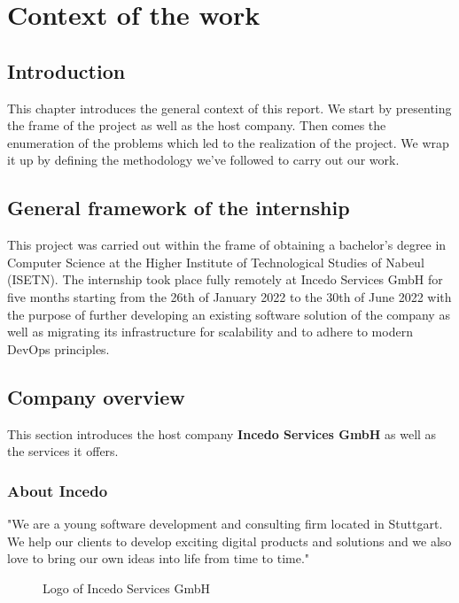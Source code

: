 \chapter{Context of the work}
\newpage

\setcounter{secnumdepth}{0} %
\section{Introduction}
This chapter introduces the general context of this report.
We start by presenting the frame of the project as well as the host company.
Then comes the enumeration of the problems which led to the realization of the project.
We wrap it up by defining the methodology we’ve followed to carry out our work.

\setcounter{secnumdepth}{2} %
\section{General framework of the internship}
This project was carried out within the frame of obtaining a bachelor’s degree in Computer Science at the Higher Institute of Technological Studies of Nabeul (ISETN).
The internship took place fully remotely at Incedo Services GmbH for five months starting from the 26th of January 2022 to the 30th of June 2022 with the purpose of further developing an existing software solution of the company as well as migrating its infrastructure for scalability and to adhere to modern DevOps principles.

\section{Company overview}
This section introduces the host company {\bf Incedo Services GmbH} as well as the services it offers.
\subsection{About Incedo}
"We are a young software development and consulting firm located in Stuttgart.
We help our clients to develop exciting digital products and solutions and we also love to bring our own ideas into life from time to time." \cite{about-incedo}
\begin{figure}[H]
    \centering
    \caption{Logo of Incedo Services GmbH}
    \label{fig:logo-of-incedo}
\end{figure}

